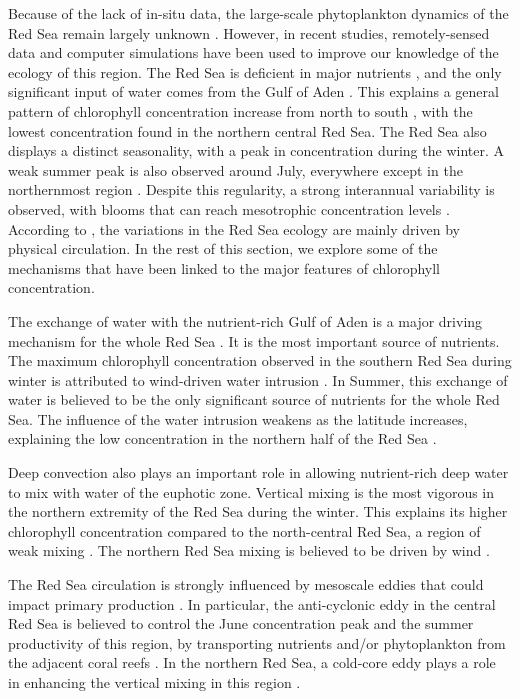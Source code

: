 Because of the lack of in-situ data, the large-scale phytoplankton dynamics of
the Red Sea remain largely unknown \citep{Raitsos2013, Triantafyllou2014}.
However, in recent studies, remotely-sensed data and computer simulations have
been used to improve our knowledge of the ecology of this region. The Red Sea
is deficient in major nutrients \citep{Weikert1987}, and the only significant
input of water comes from the Gulf of Aden \citep{Yao2015}. This explains a
general pattern of chlorophyll concentration increase from north to south
\citep{Raitsos2013}, with the lowest concentration found in the northern
central Red Sea. The Red Sea also displays a distinct seasonality, with a peak
in concentration during the winter.  A weak summer peak is also observed around
July, everywhere except in the northernmost region \citep{Raitsos2013}. Despite
this regularity, a strong interannual variability is observed, with blooms that
can reach mesotrophic concentration levels \citep{Raitsos2013}. According to
\citet{Triantafyllou2014}, the variations in the Red Sea ecology are mainly
driven by physical circulation. In the rest of this section, we explore some of
the mechanisms that have been linked to the major features of chlorophyll
concentration.

The exchange of water with the nutrient-rich Gulf of Aden is a major driving
mechanism for the whole Red Sea \citep{Triantafyllou2014}. It is the most
important source of nutrients. The maximum chlorophyll concentration observed
in the southern Red Sea during winter is attributed to wind-driven water
intrusion \citep{Raitsos2013}. In Summer, this exchange of water is believed to
be the only significant source of nutrients for the whole Red Sea. The
influence of the water intrusion weakens as the latitude increases, explaining
the low concentration in the northern half of the Red Sea \citep{Raitsos2013}.

Deep convection also plays an important role in allowing nutrient-rich deep
water to mix with water of the euphotic zone. Vertical mixing is the most
vigorous in the northern extremity of the Red Sea during the winter. This
explains its higher chlorophyll concentration compared to the north-central Red
Sea, a region of weak mixing \citep{Raitsos2013}. The northern Red Sea mixing
is believed to be driven by wind \citep{Raitsos2013}.

The Red Sea circulation is strongly influenced by mesoscale eddies
\citep{Yao2014, Yao2014b, Zhan2014} that could impact primary production
\citep{Zhai2013}.  In particular, the anti-cyclonic eddy in the central Red Sea
is believed to control the June concentration peak and the summer productivity
of this region, by transporting nutrients and/or phytoplankton from the
adjacent coral reefs \citep{Raitsos2013}. In the northern Red Sea, a cold-core
eddy plays a role in enhancing the vertical mixing in this region
\citep{Raitsos2013}.

